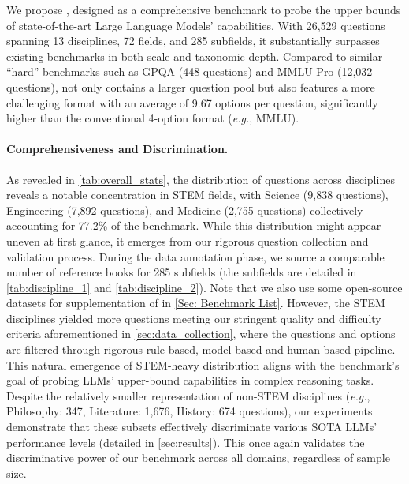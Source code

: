 We propose \benchmark, designed as a comprehensive benchmark to probe the upper bounds of state-of-the-art Large Language Models' capabilities. With 26,529 questions spanning 13 disciplines, 72 fields, and 285 subfields, it substantially surpasses existing benchmarks in both scale and taxonomic depth. Compared to similar ``hard'' benchmarks such as GPQA (448 questions) and MMLU-Pro (12,032 questions), \benchmark not only contains a larger question pool but also features a more challenging format with an average of 9.67 options per question, significantly higher than the conventional 4-option format (\emph{e.g.}, MMLU).

\paragraph{Comprehensiveness and Discrimination.} As revealed in \autoref{tab:overall_stats}, the distribution of questions across disciplines reveals a notable concentration in STEM fields, with Science (9,838 questions), Engineering (7,892 questions), and Medicine (2,755 questions) collectively accounting for 77.2\% of the benchmark. While this distribution might appear uneven at first glance, it emerges from our rigorous question collection and validation process. During the data annotation phase, we source a comparable number of reference books for 285 subfields (the subfields are detailed in \autoref{tab:discipline_1} and \autoref{tab:discipline_2}). Note that we also use some open-source datasets for supplementation of \benchmark in \autoref{Sec: Benchmark List}. However, the STEM disciplines yielded more questions meeting our stringent quality and difficulty criteria aforementioned in \autoref{sec:data_collection}, where the questions and options are filtered through rigorous rule-based, model-based and human-based pipeline. This natural emergence of STEM-heavy distribution aligns with the benchmark's goal of probing LLMs' upper-bound capabilities in complex reasoning tasks.
Despite the relatively smaller representation of non-STEM disciplines (\emph{e.g.}, Philosophy: 347, Literature: 1,676, History: 674 questions), our experiments demonstrate that these subsets effectively discriminate various SOTA LLMs' performance levels (detailed in \autoref{sec:results}). This once again validates the discriminative power of our benchmark across all domains, regardless of sample size.

